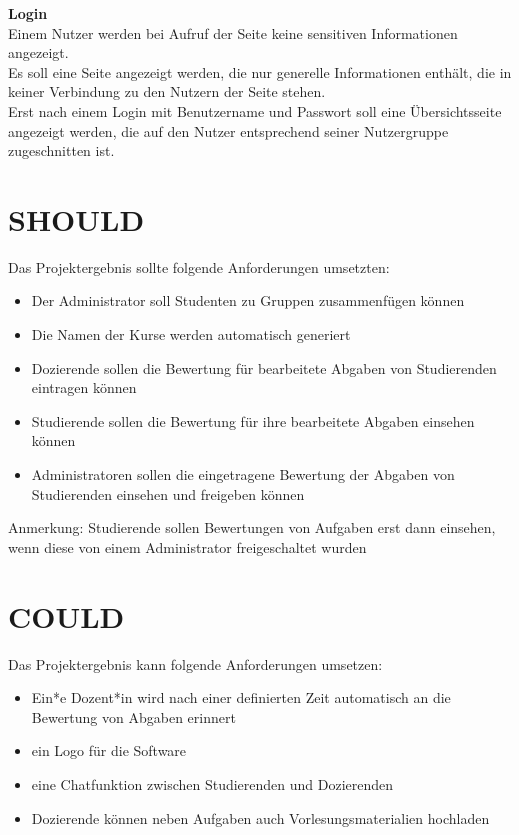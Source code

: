 \textbf{Login} \\
Einem Nutzer werden bei Aufruf der Seite keine sensitiven Informationen angezeigt. \\
Es soll eine Seite angezeigt werden, die nur generelle Informationen enthält, die in keiner Verbindung zu den Nutzern der Seite stehen. \\
Erst nach einem Login mit Benutzername und Passwort soll eine Übersichtsseite angezeigt werden, die auf den Nutzer entsprechend seiner Nutzergruppe zugeschnitten ist. \\

\section{SHOULD}
Das Projektergebnis sollte folgende Anforderungen umsetzten:
\begin{itemize}
\item Der Administrator soll Studenten zu Gruppen zusammenfügen können
\item Die Namen der Kurse werden automatisch generiert
\item Dozierende sollen die Bewertung für bearbeitete Abgaben von Studierenden eintragen können
\item Studierende sollen die Bewertung für ihre bearbeitete Abgaben einsehen können
\item Administratoren sollen die eingetragene Bewertung der Abgaben von Studierenden einsehen und freigeben können
\end{itemize}

Anmerkung: Studierende sollen Bewertungen von Aufgaben erst dann einsehen, wenn diese von einem Administrator freigeschaltet wurden

\section{COULD}
Das Projektergebnis kann folgende Anforderungen umsetzen:
\begin{itemize}
\item Ein*e Dozent*in wird nach einer definierten Zeit automatisch an die Bewertung von Abgaben erinnert
\item ein Logo für die Software
\item eine Chatfunktion zwischen Studierenden und Dozierenden
\item Dozierende können neben Aufgaben auch Vorlesungsmaterialien hochladen
\end{itemize}





